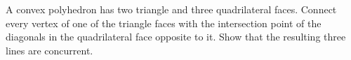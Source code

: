 A convex polyhedron has two triangle and three quadrilateral faces. Connect every vertex of one of the triangle faces with the intersection point of the diagonals in the quadrilateral face opposite to it. Show that the resulting three lines are concurrent.